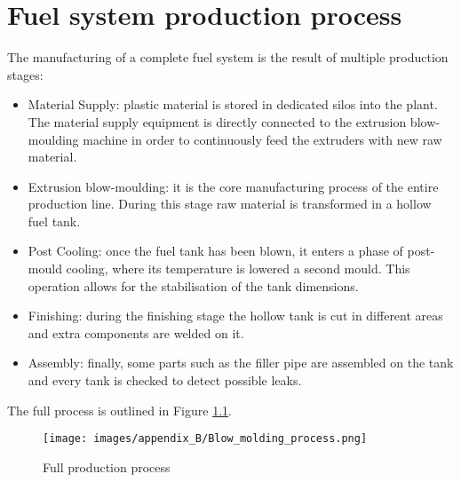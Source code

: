 \chapter{Fuel system production process} \label{Fuel system production process}

The manufacturing of a complete fuel system is the result of multiple production stages: 

\begin{itemize}
    \item Material Supply: plastic material is stored in dedicated silos into the plant. The material supply equipment is directly connected to the extrusion blow-moulding machine in order to continuously feed the extruders with new raw material.
    \item Extrusion blow-moulding: it is the core manufacturing process of the entire production line. During this stage raw material is transformed in a hollow fuel tank. 
    \item Post Cooling: once the fuel tank has been blown, it enters a phase of post-mould cooling, where its temperature is lowered a second mould. This operation allows for the stabilisation of the tank dimensions.
    \item Finishing: during the finishing stage the hollow tank is cut in different areas and extra components are welded on it.
    \item Assembly: finally, some parts such as the filler pipe are assembled on the tank and every tank is checked to detect possible leaks.
\end{itemize}

The full process is outlined in Figure \ref{fig:Full_production_process}.

\begin{figure}
\centerline{\texttt{[image: images/appendix\_B/Blow\_molding\_process.png]}}
\caption{Full production process}
\label{fig:Full_production_process}
\end{figure}